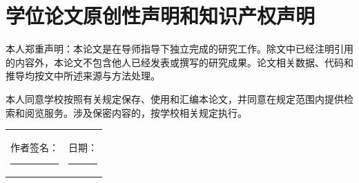 \chapter*{学位论文原创性声明和知识产权声明}
本人郑重声明：本论文是在导师指导下独立完成的研究工作。除文中已经注明引用的内容外，本论文不包含他人已经发表或撰写的研究成果。论文相关数据、代码和推导均按文中所述来源与方法处理。

本人同意学校按照有关规定保存、使用和汇编本论文，并同意在规定范围内提供检索和阅览服务。涉及保密内容的，按学校相关规定执行。

\vspace{2cm}
\begin{tabular}{@{}ll@{}}作者签名：\rule[-2pt]{3cm}{0.4pt} & 日期：\rule[-2pt]{3cm}{0.4pt}\end{tabular}
